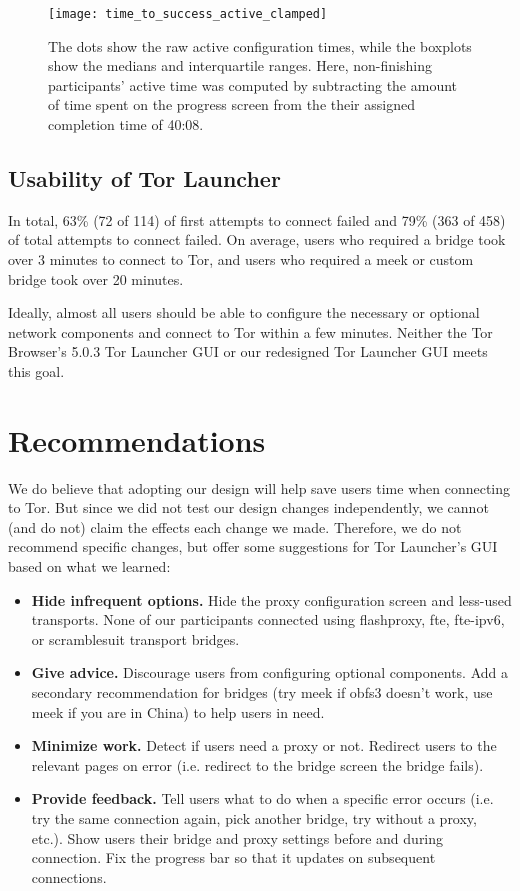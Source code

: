 \documentclass[USenglish,oneside,twocolumn]{article}
\begin{document}
\begin{figure}[t]
\centering
\texttt{[image: time\_to\_success\_active\_clamped]}
\caption{
The dots show the raw active configuration times,
while the boxplots show the medians and interquartile ranges.
Here, non-finishing participants' active time was computed by
subtracting the amount of time spent on the progress screen from the 
their assigned completion time of 40:08.
}
\label{fig:time_to_success_active_clamped}
\end{figure}

\subsection{Usability of Tor Launcher} 
In total, 63\% (72 of 114) of first attempts to connect failed and 79\% (363 of 458) of total attempts to connect failed. 
On average, users who required a bridge took over 3 minutes to connect to Tor, and users who required a meek or custom bridge took over 20 minutes.

Ideally, almost all users should be able to configure the necessary or optional network components and connect to Tor within a few minutes. Neither the Tor Browser's 5.0.3 Tor Launcher GUI or our redesigned Tor Launcher GUI meets this goal.

\section{Recommendations}
\label{sec:recommendations}
We do believe that adopting our design will help save users time when connecting to Tor. But since we did not test our design changes independently, we cannot (and do not) claim the effects each change we made. Therefore, we do not recommend specific changes, but offer some suggestions for Tor Launcher's GUI based on what we learned: \\

\begin{itemize}
\item {\bfseries Hide infrequent options.} Hide the proxy configuration screen and less-used transports. None of our participants connected using flashproxy, fte, fte-ipv6, or scramblesuit transport bridges. 
\item {\bfseries Give advice.} Discourage users from configuring optional components. Add a secondary recommendation for bridges (try meek if obfs3 doesn't work, use meek if you are in China) to help users in need. 
\item {\bfseries Minimize work.} Detect if users need a proxy or not. Redirect users to the relevant pages on error (i.e. redirect to the bridge screen the bridge fails).  
\item {\bfseries Provide feedback.} Tell users what to do when a specific error occurs (i.e. try the same connection again, pick another bridge, try without a proxy, etc.).  Show users their bridge and proxy settings before and during connection. Fix the progress bar so that it updates on subsequent connections.
\end{itemize}
\end{document}
